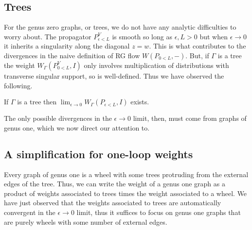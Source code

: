 \documentclass[10pt]{article}
\begin{document}
\subsection{Trees}

For the genus zero graphs, or trees, we do not have any analytic difficulties to worry about. 
The propagator $P_{\epsilon<L}^V$ is smooth so long as $\epsilon,L > 0$ but when $\epsilon \to 0$ it inherits a singularity along the diagonal $z = w$.
This is what contributes to the divergences in the naive definition of RG flow $W(P_{0<L}, -)$.
But, if $\Gamma$ is a tree the weight $W_\Gamma(P_{0<L}^V, I)$ only involves multiplication of distributions with transverse singular support, so is well-defined.
Thus we have observed the following.

\begin{lem} 
If $\Gamma$ is a tree then $\lim_{\epsilon \to 0} W_{\Gamma}(P_{\epsilon < L}, I)$ exists.
\end{lem}

The only possible divergences in the $\epsilon \to 0$ limit, then, must come from graphs of genus one, which we now direct our attention to.

\subsection{A simplification for one-loop weights}

Every graph of genus one is a wheel with some trees protruding from the external edges of the tree.
Thus, we can write the weight of a genus one graph as a product of weights associated to trees times the weight associated to a wheel.
We have just observed that the weights associated to trees are automatically convergent in the $\epsilon \to 0$ limit, thus it suffices to focus on genus one graphs that are purely wheels with some number of external edges.
\end{document}
